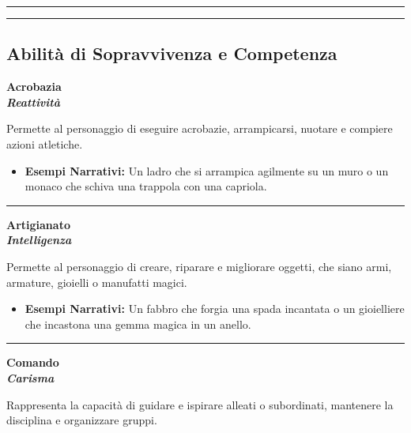 \documentclass[../manuale_main.tex]{subfiles}
\begin{document}
\vspace{0.5cm}\rule{\textwidth}{0.4pt}\vspace{0.5cm}

\vspace{0.5cm}
\rule{\textwidth}{0.4pt}
\vspace{0.5cm}

\subsection{Abilità di Sopravvivenza e Competenza}

\begin{center}
\textbf{\large{Acrobazia}}\\ \textit{\textbf{Reattività}}\\
\end{center}
Permette al personaggio di eseguire acrobazie, arrampicarsi, nuotare e compiere azioni atletiche.

\begin{itemize}
\item \textbf{Esempi Narrativi:} Un ladro che si arrampica agilmente su un muro o un monaco che schiva una trappola con una capriola.
\end{itemize}

\vspace{0.5cm}\rule{\textwidth}{0.4pt}\vspace{0.5cm}


\begin{center}
\textbf{\large{Artigianato}}\\ \textit{\textbf{Intelligenza}}\\
\end{center}
Permette al personaggio di creare, riparare e migliorare oggetti, che siano armi, armature, gioielli o manufatti magici.

\begin{itemize}
\item \textbf{Esempi Narrativi:} Un fabbro che forgia una spada incantata o un gioielliere che incastona una gemma magica in un anello.
\end{itemize}

\vspace{0.5cm}\rule{\textwidth}{0.4pt}\vspace{0.5cm}

\begin{center}
\textbf{\large{Comando}}\\ \textit{\textbf{Carisma}}\\
\end{center}
Rappresenta la capacità di guidare e ispirare alleati o subordinati, mantenere la disciplina e organizzare gruppi.
\end{document}
